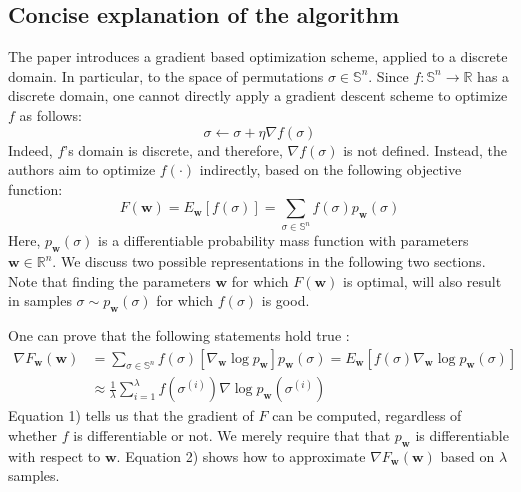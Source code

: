 \documentclass[a4paper,10pt]{article}
\newcommand{\ReplaceMe}[1]{{\color{blue}#1}}
\begin{document}
	\subsection{Concise explanation of the algorithm}
	The paper introduces a gradient based optimization scheme, applied to a discrete domain. In particular, to the space of permutations $\sigma \in \mathbb{S}^n$. 
	Since $f : \mathbb{S}^n \rightarrow \mathbb{R}$ has a discrete domain, one cannot directly apply a gradient descent scheme to optimize $f$ as follows:
	$$
	\sigma \leftarrow \sigma + \eta \nabla f(\sigma)
	$$
	Indeed, $f$'s domain is discrete, and therefore, $\nabla f(\sigma)$ is not defined. Instead, the authors aim to optimize $f(\cdot)$ indirectly, based on the following objective function:
	$$F(\mathbf{w}) = E_\mathbf{w}[f(\sigma)] = \sum_{\sigma \in \mathbb{S}^n} f(\sigma) p_\mathbf{w}(\sigma)$$
	Here, $p_\mathbf{w}(\sigma)$ is a differentiable probability mass function with parameters $\mathbf{w} \in \mathbb{R}^n$. We discuss two possible representations in the following two sections. Note that finding the parameters $\mathbf{w}$ for which $F(\mathbf{w})$ is optimal, will also result in samples $\sigma \sim p_\mathbf{w}(\sigma)$ for which $f(\sigma)$ is good.
	
	One can prove that the following statements hold true \citep{santucci_gradient_2020}:
	\begin{align}
	\nabla F_\mathbf{w}(\mathbf{w}) & = \sum_{\sigma \in \mathbb{S}^n} f(\sigma) \left[ \nabla_\mathbf{w} \log p_\mathbf{w}\right] p_\mathbf{w}(\sigma) = E_\mathbf{w} \left[f(\sigma) \nabla_\mathbf{w} \log p_\mathbf{w}(\sigma) \right] \\
									& \approx \frac{1}{\lambda} \sum_{i=1}^{\lambda} f(\sigma^{(i)}) \nabla \log p_\mathbf{w}(\sigma^{(i)})
	\end{align}
	Equation 1) tells us that the gradient of $F$ can be computed, regardless of whether $f$ is differentiable or not. We merely require that that $p_\mathbf{w}$ is differentiable with respect to $\mathbf{w}$. Equation 2) shows how to approximate $\nabla F_\mathbf{w}(\mathbf{w})$ based on $\lambda$ samples.
	
	
	


%
	
\end{document}
